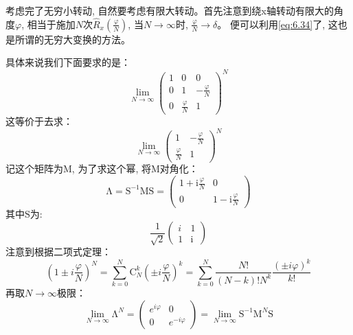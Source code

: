 考虑完了无穷小转动, 自然要考虑有限大转动。首先注意到绕x轴转动有限大的角度$\varphi$, 相当于施加$N$次$\hat{R}_x\left(\frac{\varphi}{N}\right)$, 当$N\to\infty$时, $\frac{\varphi}{N}\to\delta$。
便可以利用\ref{eq:6.34}了, 这也是所谓的无穷大变换的方法。

具体来说我们下面要求的是：
\begin{equation}
    \lim_{N\to\infty}
    \left(\begin{array}{ccc}
        1 & 0 & 0 \\
        0 & 1 & -\frac{\varphi}{N} \\
        0 & \frac{\varphi}{N}& 1
        \end{array}\right)^N
\end{equation}
这等价于去求：
\begin{equation}
    \lim_{N\to\infty}
    \left(\begin{array}{ccc}
        1 & -\frac{\varphi}{N} \\
        \frac{\varphi}{N}& 1
        \end{array}\right)^N
\end{equation}
记这个矩阵为$\mathrm{M}$, 为了求这个幂, 将$\mathrm{M}$对角化：
\begin{equation}
    \mathrm{\Lambda}=\mathrm{S}^{-1}\mathrm{M}\mathrm{S}=\begin{pmatrix}
        1+\mathrm i\frac{\varphi}{N} &0 \\
       0 &1-\mathrm  i\frac{\varphi}{N} 
      \end{pmatrix}
\end{equation}
其中$\mathrm{S}$为:
\[
    \frac{1}{\sqrt{2}}\begin{pmatrix}
        i &1 \\
        1 &\mathrm i
       \end{pmatrix}
\]
注意到根据二项式定理：
\begin{equation}
    \left(1 \pm i \frac{\varphi}{N}\right)^{N}=\sum_{k=0}^{N}\mathrm C_N^{k}\left(\pm i \frac{\varphi}{N}\right)^{k}=\sum_{k=0}^{N} \frac{N !}{(N-k) ! N^{k}} \frac{(\pm i \varphi)^{k}}{k !}
\end{equation}
再取$N\to \infty$极限：
\begin{equation}
    \lim_{N\to\infty}\mathrm{\Lambda}^N=
    \begin{pmatrix}
        e^{i\varphi} &0 \\
        0 &e^{-i\varphi}
    \end{pmatrix}
    =\lim_{N\to\infty}\mathrm{S}^{-1}\mathrm{M}^N\mathrm{S}
\end{equation}
